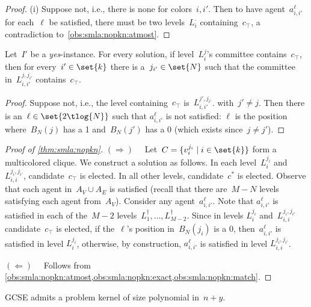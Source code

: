 \documentclass[10pt,a4paper,twocolumn]{article}
\theoremstyle{plain}
\theoremstyle{definition}
\theoremstyle{remark}
\newcommand{\prob}[1]{\textnormal{\textsc{#1}}}
\newcommand{\RD}{$(\Rightarrow)\quad$}
\newcommand{\LD}{$(\Leftarrow)\quad$}
\newcommand{\yes}{\emph{yes}}
\newcommand{\true}{\top}
\newcommand{\smlaAcr}{\prob{GCSE}}
\begin{document}
{{{{\begin{proof}
  (i) Suppose not,
  i.e.,
  there is none for colors~$i,i'$.
  Then to have agent~$a_{i,i'}^\ell$ for each~$\ell$
  be satisfied,
  there must be two levels~$L_{i}^{\cdot}$ containing~$c_\true$,
  a contradiction to~\cref{obs:smla:nopkn:atmost}.
  \end{proof}
}

\begin{observation}%
 \label{obs:smla:nopkn:match}
 Let~$I'$ be a \yes-instance.
 For every solution,
 if level~$L_i^j$'s committee contains~$c_\true$,
 then for every~$i'\in\set{k}$ there is a~$j_{i'}\in\set{N}$ such that
 the committee in~$L_{i,i'}^{j,j_{i'}}$ contains~$c_\true$.
\end{observation}

%
{
  \begin{proof}
  Suppose not,
  i.e.,
  the level containing~$c_\true$ is~$L_{i,i'}^{j',j_{i'}}$. with~$j'\neq j$.
  Then there is an~$\ell\in\set{2\tlog{N}}$ such that
  $a_{i,i'}^\ell$ is not satisfied:
  $\ell$ is the position where~$B_N(j)$ has a 1 
  and~$B_N(j')$ has a 0
  (which exists since~$j\neq j'$).
  \end{proof}
}

\begin{proof}[Proof of \cref{thm:smla:nopkn}]
 \RD{}
 Let~$C=\{v_i^{j_i}\mid i\in\set{k}\}$ form a multicolored clique.
 We construct a solution as follows.
 In each level~$L_{i}^{j_i}$ and~$L_{i,i}^{j_i,j_{i'}}$,
 candidate~$c_\true$ is elected.
 In all other levels,
 candidate~$c^*$ is elected.
 Observe that each agent in~$A_V\cup A_E$ is satisfied
 (recall that there are~$M-N$ levels satisfying each agent from~$A_V$).
 Consider any agent~$a_{i,i'}^\ell$.
 Note that $a_{i,i'}^\ell$ is satisfied in each of the~$M-2$ levels~$L_1^\dagger,\dots,L_{M-2}^\dagger$.
 Since in levels $L_{i}^{j_i}$ and~$L_{i,i}^{j_i,j_{i'}}$
 candidate~$c_\true$ is elected,
 if the~$\ell$'s position in~$B_N(j_i)$ is a 0,
 then~$a_{i,i'}^\ell$ is satisfied in level $L_{i}^{j_i}$,
 otherwise,
 by construction,
 $a_{i,i'}^\ell$ is satisfied in level $L_{i,i}^{j_i,j_{i'}}$.
 
 \LD{}
 Follows from \cref{obs:smla:nopkn:atmost,obs:smla:nopkn:exact,obs:smla:nopkn:match}.
\end{proof}
}
}

\begin{proposition}
 \label{thm:pknpy}
 \smlaAcr{}
 admits 
 a problem kernel of size polynomial in~$n+y$.
\end{proposition}

\newcommand{\critical}{critical}
\newcommand{\ncritical}{non-critical}
\newcommand{\validS}{Z}

}
\end{document}
